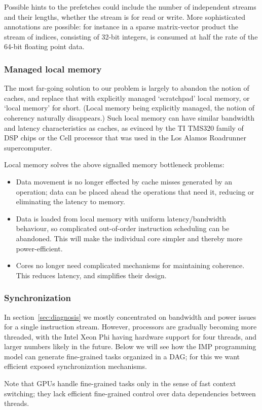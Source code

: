 Possible hints to the prefetches could include
the number of independent streams and their lengths,
whether the stream is for read or write. More sophisticated
annotations are possible: for instance in a sparse matrix-vector
product the stream of indices, consisting of 32-bit integers,
is consumed at half the rate of the 64-bit floating point data.



\subsubsection{Managed local memory}

The most far-going solution to our problem is largely to abandon the notion
of caches, and replace that with explicitly managed `scratchpad' local memory,
or `local memory' for short.
(Local memory being explicitly managed, the notion of coherency naturally disappears.)
Such local memory can have similar bandwidth and latency characteristics
as caches, as evinced by the TI TMS320 family of DSP chips
or the Cell processor that was used in the Los Alamos Roadrunner supercomputer.

Local memory solves the above signalled memory bottleneck problems:
\begin{itemize}
\item Data movement is no longer effected by cache misses generated by
  an operation; data can be placed ahead the operations that need it,
  reducing or eliminating the latency to memory.
\item Data is loaded from local memory with uniform latency/bandwidth behaviour,
  so complicated out-of-order instruction scheduling can be abandoned.
  This will make the individual core simpler and thereby more power-efficient.
\item Cores no longer need complicated mechanisms for maintaining coherence.
  This reduces latency, and simplifies their design.
\end{itemize}

\subsubsection{Synchronization}

In section~\ref{sec:diagnosis} we mostly concentrated on bandwidth and power issues 
for a single instruction stream. However, processors are gradually becoming more threaded,
with the Intel Xeon Phi having hardware support for four threads, and larger numbers
likely in the future. Below we will see how the \ac{IMP} programming model can 
generate fine-grained tasks organized in a DAG; for this we want efficient
exposed synchronization mechanisms.

Note that GPUs handle fine-grained tasks only in the sense of fast context switching;
they lack efficient fine-grained control over data dependencies between threads.


